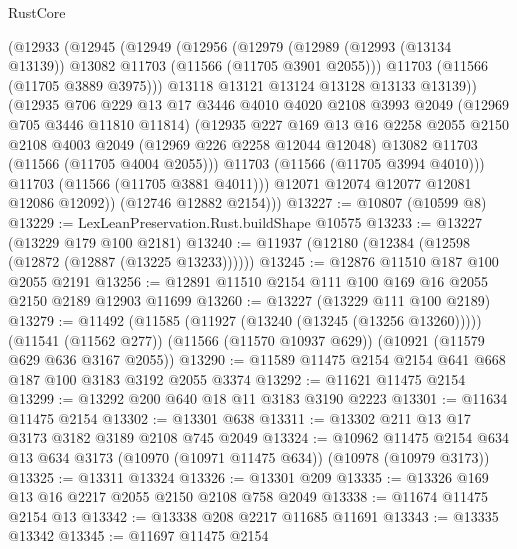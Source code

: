 \begin{lexlean}{RustCore}
\begin{coremodule}
          (@12933
            (@12945
              (@12949
                (@12956
                  (@12979
                    (@12989 (@12993 (@13134 @13139)) @13082 @11703 (@11566 (@11705 @3901 @2055)))
                    @11703
                    (@11566 (@11705 @3889 @3975)))
                  @13118
                  @13121
                  @13124
                  @13128
                  @13133
                  @13139))
              (@12935
                @706
                @229
                @13
                @17
                @3446
                @4010
                @4020
                @2108
                @3993
                @2049
                (@12969 @705 @3446 @11810 @11814)
                (@12935
                  @227
                  @169
                  @13
                  @16
                  @2258
                  @2055
                  @2150
                  @2108
                  @4003
                  @2049
                  (@12969 @226 @2258 @12044 @12048)
                  @13082
                  @11703
                  (@11566 (@11705 @4004 @2055)))
                @11703
                (@11566 (@11705 @3994 @4010)))
              @11703
              (@11566 (@11705 @3881 @4011)))
            @12071
            @12074
            @12077
            @12081
            @12086
            @12092))
        (@12746 @12882 @2154)))
@13227 := @10807 (@10599 @8)
@13229 := LexLeanPreservation.Rust.buildShape @10575
@13233 := @13227 (@13229 @179 @100 @2181)
@13240 := @11937 (@12180 (@12384 (@12598 (@12872 (@12887 (@13225 @13233))))))
@13245 := @12876 @11510 @187 @100 @2055 @2191
@13256 := @12891 @11510 @2154 @111 @100 @169 @16 @2055 @2150 @2189 @12903 @11699
@13260 := @13227 (@13229 @111 @100 @2189)
@13279 := @11492
    (@11585 (@11927 (@13240 (@13245 (@13256 @13260)))))
    (@11541 (@11562 @277))
    (@11566 (@11570 @10937 @629))
    (@10921 (@11579 @629 @636 @3167 @2055))
@13290 := @11589 @11475 @2154 @2154 @641 @668 @187 @100 @3183 @3192 @2055 @3374
@13292 := @11621 @11475 @2154
@13299 := @13292 @200 @640 @18 @11 @3183 @3190 @2223
@13301 := @11634 @11475 @2154
@13302 := @13301 @638
@13311 := @13302 @211 @13 @17 @3173 @3182 @3189 @2108 @745 @2049
@13324 := @10962
    @11475
    @2154
    @634
    @13
    @634
    @3173
    (@10970 (@10971 @11475 @634))
    (@10978 (@10979 @3173))
@13325 := @13311 @13324
@13326 := @13301 @209
@13335 := @13326 @169 @13 @16 @2217 @2055 @2150 @2108 @758 @2049
@13338 := @11674 @11475 @2154 @13
@13342 := @13338 @208 @2217 @11685 @11691
@13343 := @13335 @13342
@13345 := @11697 @11475 @2154

\end{coremodule}
\end{lexlean}
